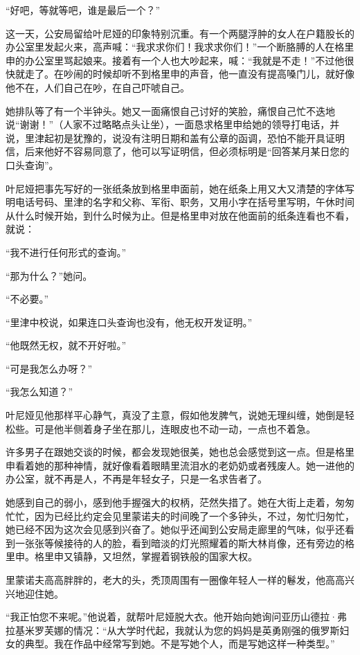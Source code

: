 “好吧，等就等吧，谁是最后一个？”

这一天，公安局留给叶尼娅的印象特别沉重。有一个两腿浮肿的女人在户籍股长的办公室里发起火来，高声喊：“我求求你们！我求求你们！”一个断胳膊的人在格里申的办公室里骂起娘来。接着有一个人也大吵起来，喊：“我就是不走！”不过他很快就走了。在吵闹的时候却听不到格里申的声音，他一直没有提高嗓门儿，就好像他不在，人们自己在吵，在自己吓唬自己。

她排队等了有一个半钟头。她又一面痛恨自己讨好的笑脸，痛恨自己忙不迭地说“谢谢！”（人家不过略略点头让坐），一面恳求格里申给她的领导打电话，并说，里津起初是犹豫的，说没有注明日期和盖有公章的函调，恐怕不能开具证明信，后来他好不容易同意了，他可以写证明信，但必须标明是“回答某月某日您的口头查询”。

叶尼娅把事先写好的一张纸条放到格里申面前，她在纸条上用又大又清楚的字体写明电话号码、里津的名字和父称、军衔、职务，又用小字在括号里写明，午休时间从什么时候开始，到什么时候为止。但是格里申对放在他面前的纸条连看也不看，就说：

“我不进行任何形式的查询。”

“那为什么？”她问。

“不必要。”

“里津中校说，如果连口头查询也没有，他无权开发证明。”

“他既然无权，就不开好啦。”

“可是我怎么办呀？”

“我怎么知道？”

叶尼娅见他那样平心静气，真没了主意，假如他发脾气，说她无理纠缠，她倒是轻松些。可是他半侧着身子坐在那儿，连眼皮也不动一动，一点也不着急。

许多男子在跟她交谈的时候，都会发现她很美，她也总会感觉到这一点。但是格里申看着她的那种神情，就好像看着眼睛里流泪水的老奶奶或者残废人。她一进他的办公室，就不再是人，不再是年轻女子，只是一名求告者了。

她感到自己的弱小，感到他手握强大的权柄，茫然失措了。她在大街上走着，匆匆忙忙，因为已经比约定会见里蒙诺夫的时间晚了一个多钟头，不过，匆忙归匆忙，她已经不因为这次会见感到兴奋了。她似乎还闻到公安局走廊里的气味，似乎还看到一张张等候接待的人的脸，看到暗淡的灯光照耀着的斯大林肖像，还有旁边的格里申。格里申又镇静，又坦然，掌握着钢铁般的国家大权。

里蒙诺夫高高胖胖的，老大的头，秃顶周围有一圈像年轻人一样的鬈发，他高高兴兴地迎住她。

“我正怕您不来呢。”他说着，就帮叶尼娅脱大衣。他开始向她询问亚历山德拉·弗拉基米罗芙娜的情况：“从大学时代起，我就认为您的妈妈是英勇刚强的俄罗斯妇女的典型。我在作品中经常写到她。不是写她个人，而是写她这样一种类型。”

